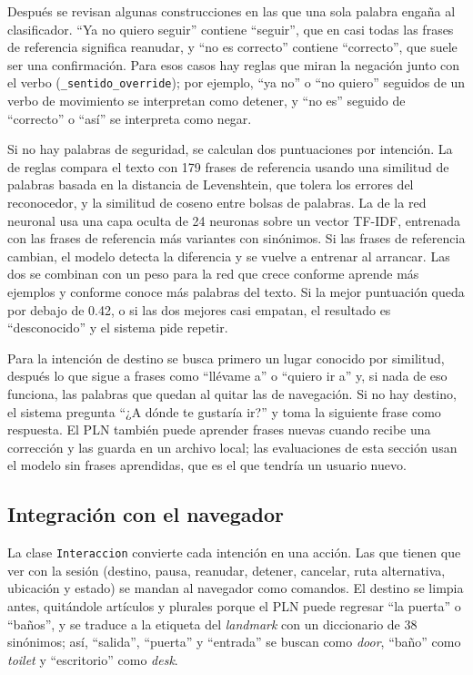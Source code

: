Después se revisan algunas construcciones en las que una sola palabra engaña al
clasificador. ``Ya no quiero seguir'' contiene ``seguir'', que en casi todas las frases
de referencia significa reanudar, y ``no es correcto'' contiene ``correcto'', que suele
ser una confirmación. Para esos casos hay reglas que miran la negación junto con el verbo
(\texttt{\_sentido\_override}); por ejemplo, ``ya no'' o ``no quiero'' seguidos de un
verbo de movimiento se interpretan como detener, y ``no es'' seguido de ``correcto'' o
``así'' se interpreta como negar.

Si no hay palabras de seguridad, se calculan dos puntuaciones por intención. La de
reglas compara el texto con 179 frases de referencia usando una similitud de palabras
basada en la distancia de Levenshtein, que tolera los errores del reconocedor, y la
similitud de coseno entre bolsas de palabras. La de la red neuronal usa una capa oculta
de 24 neuronas sobre un vector TF-IDF, entrenada con las frases de referencia más
variantes con sinónimos. Si las frases de referencia cambian, el modelo detecta la
diferencia y se vuelve a entrenar al arrancar. Las dos se combinan con un peso para la red que
crece conforme aprende más ejemplos y conforme conoce más palabras del texto. Si la
mejor puntuación queda por debajo de 0.42, o si las dos mejores casi empatan, el
resultado es ``desconocido'' y el sistema pide repetir.

Para la intención de destino se busca primero un lugar conocido por similitud, después
lo que sigue a frases como ``llévame a'' o ``quiero ir a'' y, si nada de eso funciona,
las palabras que quedan al quitar las de navegación. Si no hay destino, el sistema
pregunta ``¿A dónde te gustaría ir?'' y toma la siguiente frase como respuesta. El PLN
también puede aprender frases nuevas cuando recibe una corrección y las guarda en un
archivo local; las evaluaciones de esta sección usan el modelo sin frases aprendidas,
que es el que tendría un usuario nuevo.

\subsection{Integración con el navegador}

La clase \texttt{Interaccion} convierte cada intención en una acción. Las que tienen que
ver con la sesión (destino, pausa, reanudar, detener, cancelar, ruta alternativa,
ubicación y estado) se mandan al navegador como comandos. El destino se limpia antes,
quitándole artículos y plurales porque el PLN puede regresar ``la puerta'' o ``baños'',
y se traduce a la etiqueta del \emph{landmark} con un diccionario de 38 sinónimos; así,
``salida'', ``puerta'' y ``entrada'' se buscan como \emph{door}, ``baño'' como
\emph{toilet} y ``escritorio'' como \emph{desk}.

